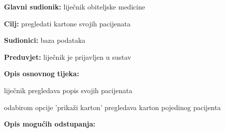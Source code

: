                     \noindent {}
					\begin{packed_item}
	
						\item \textbf{Glavni sudionik: }liječnik obiteljske medicine
						\item  \textbf{Cilj:} pregledati kartone svojih pacijenata
						\item  \textbf{Sudionici:} baza podataka
						\item  \textbf{Preduvjet:} liječnik je prijavljen u sustav
						\item  \textbf{Opis osnovnog tijeka:}
						
						\item[] \begin{packed_enum}
	
							\item 
							\item liječnik pregledava popis svojih pacijenata
							\item odabirom opcije 'prikaži karton' pregledava karton pojedinog pacijenta

						\end{packed_enum}
						
						\item  \textbf{Opis mogućih odstupanja:}
						
						\item[] \begin{packed_item}
	
							\item[2.a] 
							\item[] \begin{packed_enum}
								
								\item 
								\item 
							\end{packed_enum}
							
						\end{packed_item}
					\end{packed_item}

